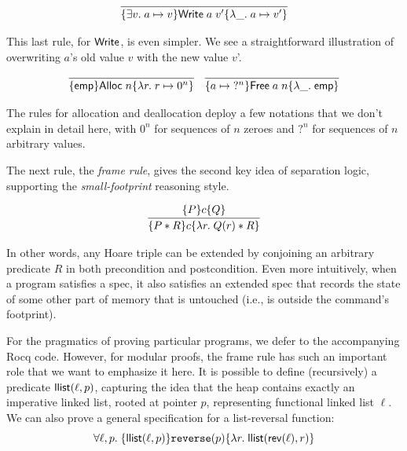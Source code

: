\documentclass{amsbook}
\theoremstyle{definition}
\theoremstyle{remark}
\numberwithin{section}{chapter}
\numberwithin{equation}{chapter}
\begin{document}
$$\infer{\hoare{\exists v. \; \ptsto{a}{v}}{\mt{Write} \; a \; v'}{\lambda \_. \; \ptsto{a}{v'}}}{}$$

This last rule, for $\mathsf{Write}$, is even simpler.
We see a straightforward illustration of overwriting $a$'s old value $v$ with the new value $v$'.

$$\infer{\hoare{\emp}{\mt{Alloc} \; n}{\lambda r. \; \ptsto{r}{0^n}}}{}
\quad \infer{\hoare{\ptsto{a}{\; ?^n}}{\mt{Free} \; a \; n}{\lambda \_. \; \emp}}{}$$

The rules for allocation and deallocation deploy a few notations that we don't explain in detail here, with $0^n$ for sequences of $n$ zeroes and $?^n$ for sequences of $n$ arbitrary values.

The next rule, the \emph{frame rule}, gives the second key idea of separation logic, supporting the \emph{small-footprint} reasoning style.

$$\infer{\hoare{P * R}{c}{\lambda r. \; Q(r) * R}}{
  \hoare{P}{c}{Q}
}$$

In other words, any Hoare triple can be extended by conjoining an arbitrary predicate $R$ in both precondition and postcondition.
Even more intuitively, when a program satisfies a spec, it also satisfies an extended spec that records the state of some other part of memory that is untouched (i.e., is outside the command's footprint).

For the pragmatics of proving particular programs, we defer to the accompanying Rocq code.
\modularity
However, for modular proofs, the frame rule has such an important role that we want to emphasize it here.
It is possible to define (recursively) a predicate $\mathsf{llist}(\ell, p)$, capturing the idea that the heap contains exactly an imperative linked list, rooted at pointer $p$, representing functional linked list $\ell$.
We can also prove a general specification for a list-reversal function:
$$\forall \ell, p. \; \{\mathsf{llist}(\ell, p)\} \texttt{reverse}(p) \{\lambda r. \; \mathsf{llist}(\mathsf{rev}(\ell), r)\}$$
\end{document}
